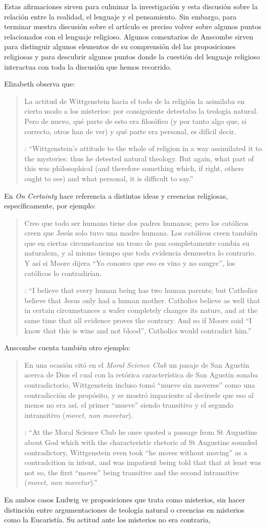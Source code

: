 Estas afirmaciones sirven para culminar la investigación y esta discusión sobre la relación entre la realidad, el lenguaje y el pensamiento. Sin embargo, para terminar nuestra discusión sobre el artículo es preciso volver sobre algunos puntos relacionados con el lenguaje religioso. Algunos comentarios de Anscombe sirven para distinguir algunos elementos de su comprensión del las proposiciones religiosas y para descubrir algunos puntos donde la cuestión del lenguaje religioso interactua con toda la discusión que hemos recorrido.

Elizabeth observa que: \blockquote[{\cite[123]{anscombe1981parmenides:qli}}: \enquote{Wittgenstein's attitude to the whole of religion in a way assimilated it to the mysteries: thus he detested natural theology. But again, what part of this was philosophical (and therefore something which, if right, others ought to see) and what personal, it is difficult to say.}]{La actitud de Wittgenstein hacia el todo de la religión la asimilaba en cierto modo a los misterios: por consiguiente detestaba la teología natural. Pero de nuevo, qué parte de esto era filosófico (y por tanto algo que, si correcto, otros han de ver) y qué parte era personal, es difícil decir.} En \emph{On Certainty} hace referencia a distintas ideas y creencias religiosas, específicamente, por ejemplo: \blockquote[{\cite[\S239]{wittgenstein1969oncert}}: \enquote{I believe that every human being has two human parents; but Catholics believe that Jesus only had a human mother. \textelp{} Catholics believe as well that in certain circumstances a wafer completely changes its nature, and at the same time that all evidence proves the contrary. And so if Moore said ``I know that this is wine and not blood'', Catholics would contradict him.}]{Creo que todo ser humano tiene dos padres humanos; pero los católicos creen que Jesús solo tuvo una madre humana. \textelp{} Los católicos creen también que en ciertas circunstancias un trozo de pan completamente cambia su naturaleza, y al mismo tiempo que toda evidencia demuestra lo contrario. Y así si Moore dijera ``Yo conozco que eso es vino y no sangre'', los católicos lo contradirían.} Anscombe cuenta también otro ejemplo:\blockquote[{\cite[122]{anscombe1981parmenides:qli}}: \enquote{At the Moral Science Club he once quoted a passage from St Augustine about God which with the characteristic rhetoric of St Augustine sounded contradictory, Wittgenstein even took ``he moves without moving'' as a contradcition in intent, and was impatient being told that that at least was not so, the first ``moves'' being transitive and the second intransitive (\emph{movet, non movetur}).}]{En una ocasión citó en el \emph{Moral Science Club} un pasaje de San Agustín acerca de Dios el cual con la retórica característica de San Agustín sonaba contradictorio, Wittgenstein incluso tomó ``mueve sin moverse'' como una contradicción de propósito, y se mostró impaciente al decírsele que eso al menos no era así, el primer ``mueve'' siendo transitivo y el segundo intransitivo (\emph{movet, non movetur}).} En ambos casos Ludwig ve proposiciones que trata como misterios, sin hacer distinción entre argumentaciones de teología natural o creencias en misterios como la Eucaristía. Su actitud ante los misterios no era contraria, 